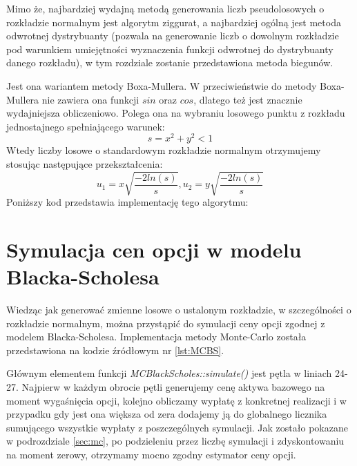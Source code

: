 \documentclass{pracamgr}
\begin{document}
Mimo że, najbardziej wydajną metodą generowania liczb pseudolosowych o rozkładzie normalnym jest algorytm ziggurat, a najbardziej ogólną jest metoda odwrotnej dystrybuanty (pozwala na generowanie liczb o dowolnym rozkładzie pod warunkiem umiejętności wyznaczenia funkcji odwrotnej do dystrybuanty danego rozkładu), w tym rozdziale zostanie przedstawiona metoda biegunów.

Jest ona wariantem metody Boxa-Mullera. W przeciwieństwie do metody 
Boxa-Mullera nie zawiera ona funkcji $sin$ oraz $cos$, dlatego też jest znacznie wydajniejsza obliczeniowo\cite{Korn}.
Polega ona na wybraniu losowego punktu z rozkładu jednostajnego spełniającego warunek:
\begin{equation}
  s = x^2 + y^2 < 1
\end{equation}
Wtedy liczby losowe o standardowym rozkładzie normalnym otrzymujemy stosując następujące przekształcenia:
\begin{equation}
  u_1 = x \sqrt{\frac{-2ln(s)}{s}}, u_2 = y \sqrt{\frac{-2ln(s)}{s}}
\end{equation}
Poniższy kod przedstawia implementację tego algorytmu:




\section{Symulacja cen opcji w modelu Blacka-Scholesa}

Wiedząc jak generować zmienne losowe o ustalonym rozkładzie, w szczególności o rozkładzie normalnym, można 
przystąpić do symulacji ceny opcji zgodnej z modelem Blacka-Scholesa.
Implementacja metody Monte-Carlo została przedstawiona na kodzie źródłowym nr \ref{lst:MCBS}.

Głównym elementem funkcji \textit{MCBlackScholes::simulate()} jest pętla w liniach 24-27. Najpierw w każdym 
obrocie pętli generujemy cenę aktywa bazowego na moment wygaśnięcia opcji, kolejno obliczamy wypłatę z konkretnej
realizacji i w przypadku gdy jest ona większa od zera dodajemy ją do globalnego licznika sumującego wszystkie 
wypłaty z poszczególnych symulacji. Jak zostało pokazane w podrozdziale \ref{sec:mc}, po podzieleniu przez liczbę symulacji i zdyskontowaniu na moment zerowy, otrzymamy mocno zgodny estymator ceny opcji.
\end{document}
